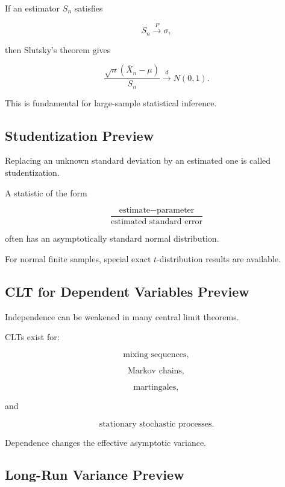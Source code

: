 If an estimator \(S_n\) satisfies

\[
S_n
\xrightarrow{P}
\sigma,
\]

then Slutsky's theorem gives

\[
\boxed{
\frac{
\sqrt{n}
(\overline{X}_n-\mu)
}{
S_n
}
\xrightarrow{d}
N(0,1).
}
\]

This is fundamental for large-sample statistical inference.

\subsection{Studentization Preview}
\label{subsec:studentization-preview}

Replacing an unknown standard deviation by an estimated one is called
studentization.

A statistic of the form

\[
\boxed{
\frac{
\text{estimate}-\text{parameter}
}{
\text{estimated standard error}
}
}
\]

often has an asymptotically standard normal distribution.

For normal finite samples, special exact \(t\)-distribution results are
available.

\subsection{CLT for Dependent Variables Preview}
\label{subsec:dependent-clt-preview}

Independence can be weakened in many central limit theorems.

CLTs exist for:

\[
\text{mixing sequences},
\]

\[
\text{Markov chains},
\]

\[
\text{martingales},
\]

and

\[
\text{stationary stochastic processes}.
\]

Dependence changes the effective asymptotic variance.

\subsection{Long-Run Variance Preview}
\label{subsec:long-run-variance-preview}

